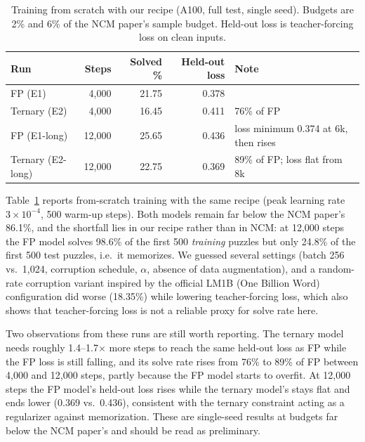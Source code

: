 \documentclass[11pt]{article}
\begin{document}
\begin{table}[t]
\centering
\caption{Training from scratch with our recipe (A100, full test, single seed). Budgets are 2\% and 6\% of the
NCM paper's sample budget. Held-out loss is teacher-forcing loss on clean inputs.}
\label{tab:scratch}
\small
\begin{tabular}{lrrrl}
\toprule
Run & Steps & Solved \% & Held-out loss & Note \\
\midrule
FP (E1)        & 4,000  & 21.75 & 0.378 & \\
Ternary (E2)   & 4,000  & 16.45 & 0.411 & 76\% of FP \\
FP (E1-long)   & 12,000 & 25.65 & 0.436 & loss minimum 0.374 at 6k, then rises \\
Ternary (E2-long) & 12,000 & 22.75 & 0.369 & 89\% of FP; loss flat from 8k \\
\bottomrule
\end{tabular}
\end{table}

Table~\ref{tab:scratch} reports from-scratch training with the same recipe (peak learning rate
$3\times10^{-4}$, 500 warm-up steps). Both models remain far below the NCM paper's 86.1\%, and the shortfall lies
in our recipe rather than in NCM: at 12,000 steps the FP model solves 98.6\% of the first 500 \emph{training}
puzzles but only 24.8\% of the first 500 test puzzles, i.e.\ it memorizes. We guessed several settings (batch 256
vs.\ 1,024, corruption schedule, $\alpha$, absence of data augmentation), and a random-rate corruption variant
inspired by the official LM1B (One Billion Word) configuration did worse (18.35\%) while lowering teacher-forcing
loss, which also shows that teacher-forcing loss is not a reliable proxy for solve rate here.

Two observations from these runs are still worth reporting. The ternary model needs roughly 1.4--1.7$\times$ more
steps to reach the same held-out loss as FP while the FP loss is still falling, and its solve rate rises from 76\% to 89\% of FP between 4,000 and
12,000 steps, partly because the FP model starts to overfit. At 12,000 steps the FP model's held-out loss rises
while the ternary model's stays flat and ends lower (0.369 vs.\ 0.436), consistent with the ternary constraint
acting as a regularizer against memorization. These are single-seed results at budgets far below the NCM paper's
and should be read as preliminary.
\end{document}
